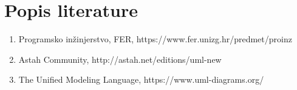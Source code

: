 \chapter*{Popis literature}

    \begin{enumerate}
        \item Programsko inžinjerstvo, FER, https://www.fer.unizg.hr/predmet/proinz
        \item Astah Community, http://astah.net/editions/uml-new
        \item The Unified Modeling Language, https://www.uml-diagrams.org/
        
    \end{enumerate}